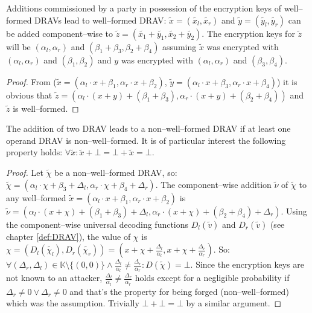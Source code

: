 \begin{lem}
  \label{lem:DRAV-add}

Additions commissioned by a party in possession of the encryption keys of
well--formed DRAVs lead to well--formed DRAV: $\widetilde{x} =
(\widetilde{x_l}, \widetilde{x_r})$ and $\widetilde{y} = (\widetilde{y_l},
\widetilde{y_r})$ can be added component--wise to $\widetilde{z} =
\left(\widetilde{x_1} + \widetilde{y_1}, \widetilde{x_2} +
\widetilde{y_2}\right)$. The encryption keys for $\widetilde{z}$ will be
$(\alpha_l, \alpha_r)$ and $(\beta_1 + \beta_3, \beta_2 + \beta_4)$ assuming
$\widetilde{x}$ was encrypted with $(\alpha_l, \alpha_r)$ and $(\beta_1,
\beta_2)$ and $y$ was encrypted with $(\alpha_l, \alpha_r)$ and $(\beta_3,
\beta_4)$.

\end{lem}
\begin{proof}

From ($\widetilde{x} = \left(\alpha_l \cdot x + \beta_1,
\alpha_r \cdot x + \beta_2\right)$, $\widetilde{y} = \left(\alpha_l \cdot x +
\beta_3, \alpha_r \cdot x + \beta_4\right)$) it is obvious that $\widetilde{z}
= \left(\alpha_l \cdot (x+y) + (\beta_1 + \beta_3), \alpha_r \cdot (x+y) +
(\beta_2 + \beta_4)\right)$ and $\widetilde{z}$ is well--formed.

\end{proof}

\begin{lem}
  \label{lem:DRAV-add-bad}

The addition of two DRAV leads to a non--well--formed DRAV if at least one
operand DRAV is non--well--formed. It is of particular interest the following
property holds: $\forall \widetilde{x}: \widetilde{x} + \bot = \bot +
\widetilde{x} = \bot$.

\end{lem}
\begin{proof}

Let $\widetilde{\chi}$ be a non--well--formed DRAV, so: $\widetilde{\chi} =
(\alpha_l \cdot \chi + \beta_3 + \Delta_l, \alpha_r \cdot \chi + \beta_4 +
\Delta_r)$. The component--wise addition $\widetilde{\nu}$ of $\widetilde{\chi}$
to any well--formed $\widetilde{x} = (\alpha_l \cdot x + \beta_1, \alpha_r \cdot
x + \beta_2)$ is $\widetilde{\nu} = (\alpha_l \cdot (x+\chi) + (\beta_1+\beta_3)
+ \Delta_l, \alpha_r \cdot (x+\chi) + (\beta_2+\beta_4) + \Delta_r)$.  Using the
component--wise universal decoding functions $D_l(\widetilde{v})$ and
$D_r(\widetilde{v})$ (see chapter \ref{def:DRAV}), the value of $\chi$ is $\chi
= (D_l(\widetilde{\chi_l}), D_r(\widetilde{\chi_r})) = (x + \chi +
\frac{\Delta_l}{\alpha_l}, x + \chi + \frac{\Delta_r}{\alpha_r})$. So: $\forall
(\Delta_r, \Delta_l) \in \mathbb{K} \setminus \{(0, 0)\} \wedge
\frac{\Delta_l}{\alpha_l} \neq \frac{\Delta_r}{\alpha_r}: D(\widetilde{\chi}) =
\bot$. Since the encryption keys are not known to an attacker,
$\frac{\Delta_l}{\alpha_l} \neq \frac{\Delta_r}{\alpha_r}$ holds except for a
negligible probability if $\Delta_r \neq 0 \vee \Delta_r \neq 0$ and that's the
property for being forged (non--well--formed) which was the assumption.
Trivially $\bot + \bot = \bot$ by a similar argument.

\end{proof}


